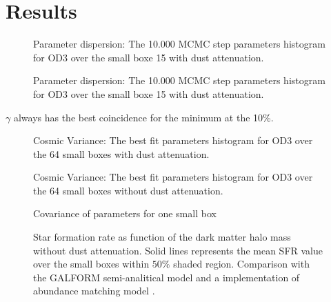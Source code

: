 \section{Results}



\begin{figure}
\caption{Parameter dispersion: The 10.000 MCMC step parameters histogram for OD3 over the small boxe 15
with dust attenuation.}
\label{fig:ParamDispWithDust}
\end{figure}


\begin{figure}
\caption{Parameter dispersion: The 10.000 MCMC step parameters histogram for OD3 over the small boxe 15
with dust attenuation.}
\label{fig:ParamDispWithoutDust}
\end{figure}

$\gamma$ always has the best coincidence for the minimum at the 10\%.




\begin{figure}
\caption{Cosmic Variance: The best fit parameters histogram for OD3 over the 64 small boxes 
with dust attenuation.}
\label{fig:ParamScatteringWithDust}
\end{figure}

\begin{figure}
\caption{Cosmic Variance: The best fit parameters histogram for OD3 over the 64 small boxes 
without dust attenuation.}
\label{fig:ParamScatteringWithoutDust}
\end{figure}


\begin{figure}
\caption{Covariance of parameters for one small box}
\label{graph_scattering_plots}
\end{figure}




\begin{figure}
\caption{Star formation rate as function of the dark matter halo mass without dust attenuation. 
Solid lines represents the mean SFR value over the small boxes within $50\%$  shaded region. 
Comparison with the GALFORM semi-analitical model \citep{gonzalez14} and a implementation
of abundance matching model \citep{behroozi13}. }
\label{graph_SFR_DMHM_wo}
\end{figure}

